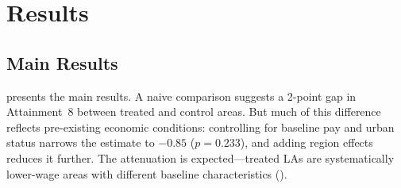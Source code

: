 \documentclass[12pt]{article}
\begin{document}
\section{Results}\label{sec:results}

\subsection{Main Results}

 presents the main results. A naive comparison suggests a 2-point gap in Attainment~8 between treated and control areas. But much of this difference reflects pre-existing economic conditions: controlling for baseline pay and urban status narrows the estimate to $-0.85$ ($p = 0.233$), and adding region effects reduces it further. The attenuation is expected---treated LAs are systematically lower-wage areas with different baseline characteristics ().
\end{document}
